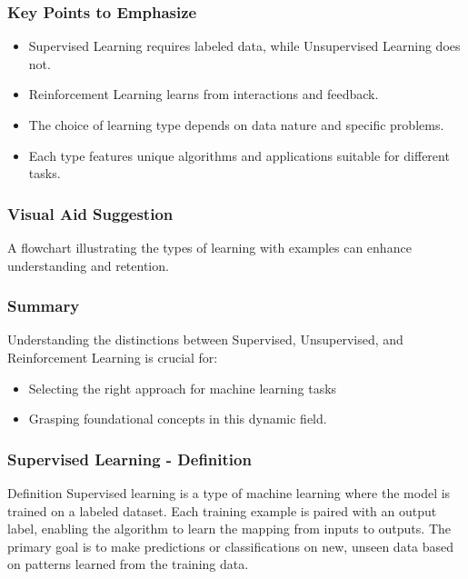 \documentclass[aspectratio=169]{beamer}
\begin{document}
\begin{frame}[fragile]
    \frametitle{Key Points to Emphasize}
    \begin{itemize}
        \item Supervised Learning requires labeled data, while Unsupervised Learning does not.
        \item Reinforcement Learning learns from interactions and feedback.
        \item The choice of learning type depends on data nature and specific problems.
        \item Each type features unique algorithms and applications suitable for different tasks.
    \end{itemize}
\end{frame}

\begin{frame}[fragile]
    \frametitle{Visual Aid Suggestion}
    A flowchart illustrating the types of learning with examples can enhance understanding and retention.
\end{frame}

\begin{frame}[fragile]
    \frametitle{Summary}
    Understanding the distinctions between Supervised, Unsupervised, and Reinforcement Learning is crucial for:
    \begin{itemize}
        \item Selecting the right approach for machine learning tasks
        \item Grasping foundational concepts in this dynamic field.
    \end{itemize}
\end{frame}

\begin{frame}[fragile]
    \frametitle{Supervised Learning - Definition}
    \begin{block}{Definition}
        Supervised learning is a type of machine learning where the model is trained on a labeled dataset. Each training example is paired with an output label, enabling the algorithm to learn the mapping from inputs to outputs. The primary goal is to make predictions or classifications on new, unseen data based on patterns learned from the training data.
    \end{block}
\end{frame}
\end{document}
